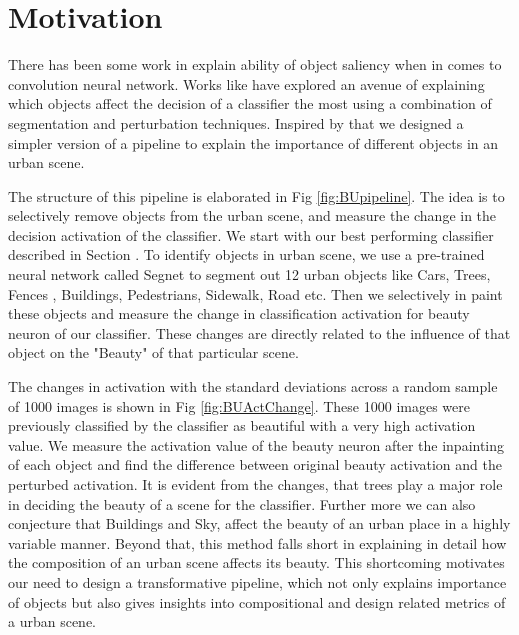\section{Motivation}
There has been some work in explain ability of object saliency when in comes to convolution neural network. Works like  have 
explored an avenue of explaining which objects affect the decision of a classifier the most using a combination of segmentation and perturbation techniques. 
Inspired by that we designed a simpler version of a pipeline to explain the importance of different objects in an urban scene. 

The structure of this pipeline is elaborated in Fig \ref{fig:BUpipeline}. The idea is to selectively remove objects from the urban scene, and measure the change in the decision activation of the 
classifier. We start with our best performing classifier described in Section . To identify objects in urban scene, we use a pre-trained 
neural network called Segnet \cite{badrinarayanan2015segnet} to segment out 12 urban objects like Cars, Trees, Fences , Buildings, Pedestrians, Sidewalk, Road etc. Then we selectively in paint
 these objects and measure the change in classification activation for beauty neuron of our classifier. These changes are directly related to the influence of that object
on the "Beauty" of that particular scene. 


The changes in activation with the standard deviations across a random sample of 1000 images is shown in Fig \ref{fig:BUActChange}. These 1000 images were previously classified by the 
classifier as beautiful with a very high activation value. We measure the activation value of the beauty neuron after the inpainting of each object and find the difference between original beauty
activation and the perturbed activation. It is evident from the changes, that trees play a major role in deciding the beauty of a scene for the classifier. Further more we can also conjecture that Buildings and Sky, affect the beauty of an urban place in a highly variable manner. Beyond that, this method falls short in explaining in detail how the composition of an urban scene affects its beauty.
This shortcoming motivates our need to design a transformative pipeline, which not only explains importance of objects but also gives insights into compositional and design related metrics of 
a urban scene.